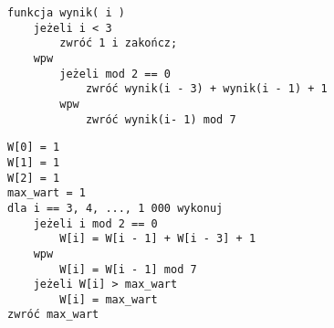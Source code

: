 \documentclass[a4paper]{article}
\begin{document}
\begin{lstlisting}[language = pseudokod, caption = \ ]
funkcja wynik( i ) 
	jeżeli i < 3 
		zwróć 1 i zakończ; 
	wpw
		jeżeli mod 2 == 0 
			zwróć wynik(i - 3) + wynik(i - 1) + 1
		wpw
			zwróć wynik(i- 1) mod 7
\end{lstlisting}

\vspace{40pt}

\begin{lstlisting}[language = pseudokod, caption = \ ]
W[0] = 1 
W[1] = 1 
W[2] = 1 
max_wart = 1 
dla i == 3, 4, ..., 1 000 wykonuj 
	jeżeli i mod 2 == 0 
		W[i] = W[i - 1] + W[i - 3] + 1
	wpw 
		W[i] = W[i - 1] mod 7
	jeżeli W[i] > max_wart 
		W[i] = max_wart
zwróć max_wart 
\end{lstlisting}
\end{document}
